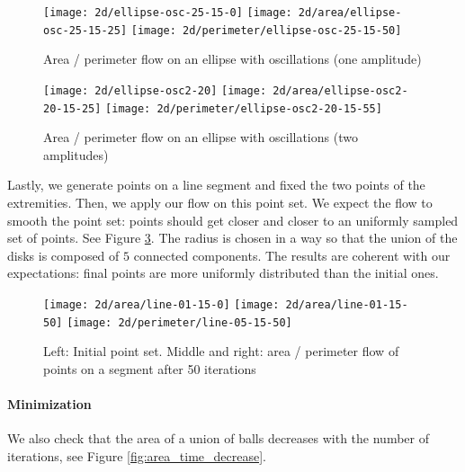\begin{figure}[h]
    \centering

    \texttt{[image: 2d/ellipse-osc-25-15-0]}
    \texttt{[image: 2d/area/ellipse-osc-25-15-25]}
    \texttt{[image: 2d/perimeter/ellipse-osc-25-15-50]}
    \caption{Area / perimeter flow on an ellipse with oscillations (one
        amplitude)}

    \label{fig:ellipse_osc_flow}
\end{figure}

\begin{figure}[h]
    \centering

    \texttt{[image: 2d/ellipse-osc2-20]}
    \texttt{[image: 2d/area/ellipse-osc2-20-15-25]}
    \texttt{[image: 2d/perimeter/ellipse-osc2-20-15-55]}
    \caption{Area / perimeter flow on an ellipse with oscillations (two
        amplitudes)}

    \label{fig:ellipse_osc2_flow}
\end{figure}

Lastly, we generate points on a line segment and fixed the two points of the
extremities. Then, we apply our flow on this point set. We expect the flow to
smooth the point set: points should get closer and closer to an uniformly
sampled set of points. See Figure \ref{fig:line_fixed_flow}. The radius is
chosen in a way so that the union of the disks is composed of $ 5 $ connected
components. The results are coherent with our expectations: final points are
more uniformly distributed than the initial ones.

\begin{figure}[h]
    \centering

    \texttt{[image: 2d/area/line-01-15-0]}
    \texttt{[image: 2d/area/line-01-15-50]}
    \texttt{[image: 2d/perimeter/line-05-15-50]}
    \caption{Left: Initial point set. Middle and right: area / perimeter flow of
        points on a segment after 50 iterations}

    \label{fig:line_fixed_flow}
\end{figure}

\paragraph{Minimization}

We also check that the area of a union of balls decreases with the number of
iterations, see Figure \ref{fig:area_time_decrease}.

